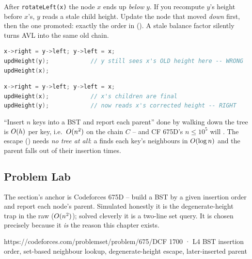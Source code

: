 \begin{warningbox}
After \texttt{rotateLeft(x)} the node $x$ ends up \emph{below} $y$. If you recompute $y$'s height
before $x$'s, $y$ reads a stale child height. Update the node that moved \emph{down} first, then the
one promoted: exactly the order in  (). A stale balance
factor silently turns AVL into the same old chain.
\end{warningbox}
\begin{lstlisting}[caption={\textcolor{warningred}{WRONG}: promoted node recomputed before its new child}, language=C++, basicstyle=\ttfamily\small]
x->right = y->left; y->left = x;
updHeight(y);            // y still sees x's OLD height here -- WRONG
updHeight(x);
\end{lstlisting}
\begin{lstlisting}[caption={\textcolor{successgreen}{RIGHT}: fix the lower node $x$ first, then its parent $y$}, language=C++, basicstyle=\ttfamily\small]
x->right = y->left; y->left = x;
updHeight(x);            // x's children are final
updHeight(y);            // now reads x's corrected height -- RIGHT
\end{lstlisting}

\begin{warningbox}
``Insert $n$ keys into a BST and report each parent'' done by walking down the tree is
$O(h)$ per key, i.e.\ $O(n^2)$ on the chain $C$ -- and CF 675D's $n\le 10^{5}$ will
\tle. The escape () needs \emph{no tree at all}: a  finds each
key's neighbours in $O(\log n)$ and the parent falls out of their insertion times.
\end{warningbox}

\subsection{Problem Lab}

The section's anchor is Codeforces 675D -- build a BST by a given insertion order and report each
node's parent. Simulated honestly it is the degenerate-height trap in the raw ($O(n^2)$); solved
cleverly it is a two-line set query. It is chosen precisely because it \emph{is} the reason this
chapter exists.

  {https://codeforces.com/problemset/problem/675/D}{CF 1700 · L4}
  {BST insertion order, set-based neighbour lookup, degenerate-height escape, later-inserted parent}

